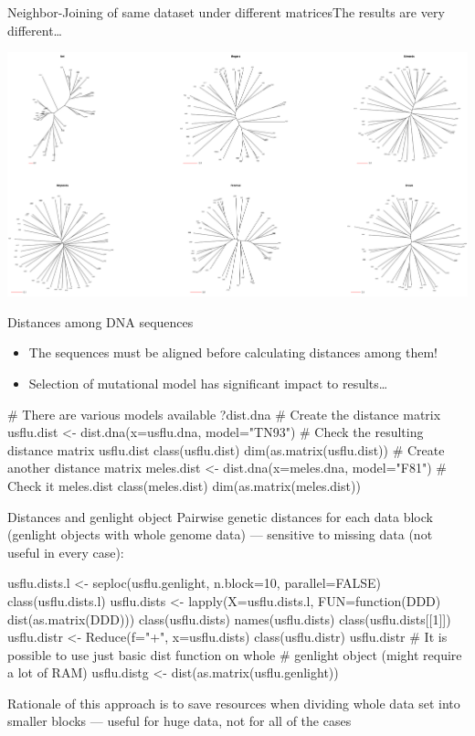 \documentclass[compress, ucs, xelatex, 11pt, xcolor=svgnames,
  hyperref={
    bookmarks=true,
    unicode=true,
    colorlinks=true,
    pdftitle={Molecular data in R},
    plainpages=false,
    pdfauthor={Vojtech Zeisek},
    pdfsubject={Course about phylogeny and evolution in R},
    pdfcreator={XeLaTeX},
    pdfkeywords={R, evolution, phylogeny, molecular data},
    linkcolor=Tomato,
    anchorcolor=SaddleBrown,
    citecolor=Goldenrod,
    filecolor=DarkMagenta,
    menucolor=Sienna,
    urlcolor=DarkTurquoise,
    pdftex},
  url={hyphens, lowtilde} %
  ]{beamer}
\begin{document}
\begin{frame}{Neighbor-Joining of same dataset under different matrices}{The results are very different\ldots}
  \begin{center}
    \includegraphics[width=\textwidth]{distances.png}
  \end{center}
\end{frame}

\begin{frame}[fragile]{Distances among DNA sequences}
  \begin{itemize}
    \item \alert{The sequences must be aligned before calculating distances among them!}
    \item Selection of mutational model has significant impact to results\ldots
  \end{itemize}
  \vfill
  \begin{spluscode}
    # There are various models available
    ?dist.dna
    # Create the distance matrix
    usflu.dist <- dist.dna(x=usflu.dna, model="TN93")
    # Check the resulting distance matrix
    usflu.dist
    class(usflu.dist)
    dim(as.matrix(usflu.dist))
    # Create another distance matrix
    meles.dist <- dist.dna(x=meles.dna, model="F81")
    # Check it
    meles.dist
    class(meles.dist)
    dim(as.matrix(meles.dist))
  \end{spluscode}
\end{frame}

\begin{frame}[fragile]{Distances and genlight object}
  \vfill
  Pairwise genetic distances for each data block (genlight objects with whole genome data) --- sensitive to missing data (not useful in every case):
  \vfill
  \begin{spluscode}
    usflu.dists.l <- seploc(usflu.genlight, n.block=10, parallel=FALSE)
    class(usflu.dists.l)
    usflu.dists <- lapply(X=usflu.dists.l, FUN=function(DDD)
      dist(as.matrix(DDD)))
    class(usflu.dists)
    names(usflu.dists)
    class(usflu.dists[[1]])
    usflu.distr <- Reduce(f="+", x=usflu.dists)
    class(usflu.distr)
    usflu.distr
    # It is possible to use just basic dist function on whole
    # genlight object (might require a lot of RAM)
    usflu.distg <- dist(as.matrix(usflu.genlight))
  \end{spluscode}
  \vfil
  Rationale of this approach is to save resources when dividing whole data set into smaller blocks --- useful for huge data, not for all of the cases
  \vfill
\end{frame}
\end{document}
